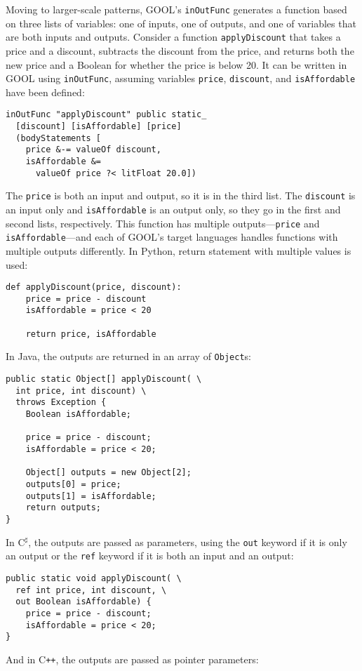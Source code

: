 \documentclass[sigplan,review,anonymous,prologue,dvipsnames]{acmart}
\newcommand{\Csharp}{C$^{\sharp}$}
\newcommand{\Cplusplus}{C\texttt{++}}
\begin{document}
Moving to larger-scale patterns, GOOL's \verb|inOutFunc| generates a function
based on three lists of variables: one of inputs, one of outputs, and one of
variables that are both inputs and outputs. Consider a function
\verb|applyDiscount| that takes a price and a discount, subtracts the discount
from the price, and returns both the new price and a Boolean for whether the
price is below 20. It can be written in GOOL using \verb|inOutFunc|, assuming
variables \verb|price|, \verb|discount|, and \verb|isAffordable| have been
defined:
\begin{lstlisting}
inOutFunc "applyDiscount" public static_
  [discount] [isAffordable] [price]
  (bodyStatements [
    price &-= valueOf discount,
    isAffordable &=
      valueOf price ?< litFloat 20.0])
\end{lstlisting}
The \verb|price| is both an input and output, so it is in the third list. The
\verb|discount| is an input only and \verb|isAffordable| is an output only, so
they go in the first and second lists, respectively. This function has multiple
outputs---\verb|price| and \verb|isAffordable|---and each of GOOL's target
languages handles functions with multiple outputs differently. In Python,
return statement with multiple values is used:
\begin{lstlisting}
def applyDiscount(price, discount):
    price = price - discount
    isAffordable = price < 20

    return price, isAffordable
\end{lstlisting}
In Java, the outputs are returned in an array of \verb|Object|s:
\begin{lstlisting}
public static Object[] applyDiscount( \
  int price, int discount) \
  throws Exception {
    Boolean isAffordable;

    price = price - discount;
    isAffordable = price < 20;

    Object[] outputs = new Object[2];
    outputs[0] = price;
    outputs[1] = isAffordable;
    return outputs;
}
\end{lstlisting}
In \Csharp, the outputs are passed as parameters, using the \verb|out| keyword if
it is only an output or the \verb|ref| keyword if it is both an input and an
output:
\begin{lstlisting}
public static void applyDiscount( \
  ref int price, int discount, \
  out Boolean isAffordable) {
    price = price - discount;
    isAffordable = price < 20;
}
\end{lstlisting}
And in \Cplusplus, the outputs are passed as pointer parameters:
\end{document}
